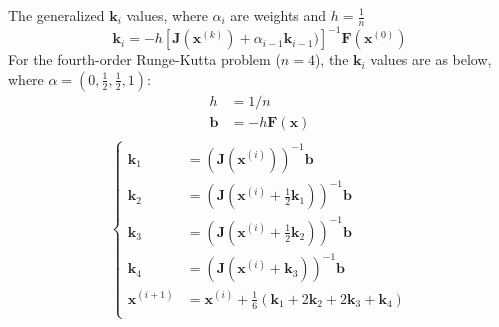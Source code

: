 \documentclass[8pt]{article}
\begin{document}
\begin{multicols}{2}
\begin{description}
      The generalized $\mathbf{k}_i$ values, where $\alpha_i$ are weights and $h=\frac{1}{n}$
      $$ \mathbf{k}_i = -h[\mathbf{J}(\mathbf{x}^{(k)})+\alpha_{i-1}\mathbf{k}_{i-1})]^{-1}\mathbf{F}(\mathbf{x}^{(0)}) $$
      For the fourth-order Runge-Kutta problem ($n=4$), the $\mathbf{k}_i$ values are as below,
      where $\alpha = (0, \frac{1}{2}, \frac{1}{2}, 1)$:
      \begin{equation*}
          \begin{aligned}
            h &= 1/n \\
            \mathbf{b} &=-h\mathbf{F}(\mathbf{x}) \\
        \end{aligned}
      \end{equation*}
      \begin{equation*}
        \left\{
        \begin{aligned}
          \mathbf{k}_1 &= (\mathbf{J}(\mathbf{x}^{(i)}))^{-1}\mathbf{b} \\
          \mathbf{k}_2 &= (\mathbf{J}(\mathbf{x}^{(i)}+\frac{1}{2}\mathbf{k}_1))^{-1}\mathbf{b} \\
          \mathbf{k}_3 &= (\mathbf{J}(\mathbf{x}^{(i)}+\frac{1}{2}\mathbf{k}_2))^{-1}\mathbf{b} \\
          \mathbf{k}_4 &= (\mathbf{J}(\mathbf{x}^{(i)}+\mathbf{k}_3))^{-1}\mathbf{b} \\
          \mathbf{x}^{(i+1)} &= \mathbf{x}^{(i)} + \frac{1}{6}(\mathbf{k}_1+2\mathbf{k}_2+2\mathbf{k}_3+\mathbf{k}_4) \\
        \end{aligned}
      \right.
      \end{equation*}
  \end{description}
\end{multicols}
\end{document}
